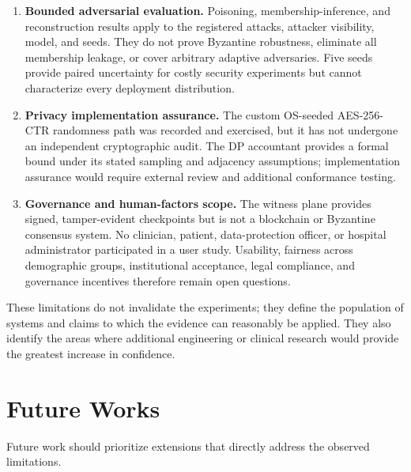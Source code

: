 \begin{enumerate}
    \item \textbf{Bounded adversarial evaluation.} Poisoning, membership-inference, and reconstruction results apply to the registered attacks, attacker visibility, model, and seeds. They do not prove Byzantine robustness, eliminate all membership leakage, or cover arbitrary adaptive adversaries. Five seeds provide paired uncertainty for costly security experiments but cannot characterize every deployment distribution.

    \item \textbf{Privacy implementation assurance.} The custom OS-seeded AES-256-CTR randomness path was recorded and exercised, but it has not undergone an independent cryptographic audit. The DP accountant provides a formal bound under its stated sampling and adjacency assumptions; implementation assurance would require external review and additional conformance testing.

    \item \textbf{Governance and human-factors scope.} The witness plane provides signed, tamper-evident checkpoints but is not a blockchain or Byzantine consensus system. No clinician, patient, data-protection officer, or hospital administrator participated in a user study. Usability, fairness across demographic groups, institutional acceptance, legal compliance, and governance incentives therefore remain open questions.
\end{enumerate}

These limitations do not invalidate the experiments; they define the population of systems and claims to which the evidence can reasonably be applied. They also identify the areas where additional engineering or clinical research would provide the greatest increase in confidence.

\section{Future Works}
\label{sec:future-work}

Future work should prioritize extensions that directly address the observed limitations.

